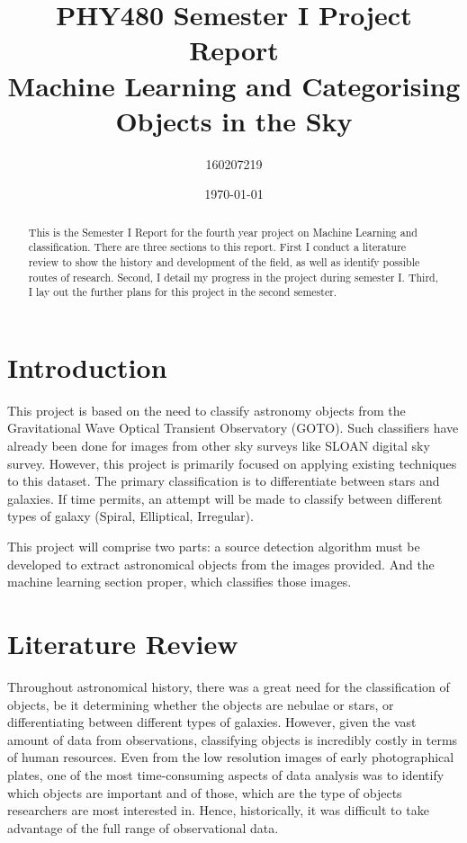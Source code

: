 \documentclass[a4paper,11pt]{article}
\title{{\small PHY480 Semester I Project Report}
\\
\vspace{5mm}
Machine Learning and Categorising Objects in the Sky}
\author{160207219}
\date{\today}
\begin{document}
\maketitle

\begin{abstract}
This is the Semester I Report for the fourth year project on Machine Learning and classification. There are three sections to this report. First I conduct a literature review to show the history and development of the field, as well as identify possible routes of research. Second, I detail my progress in the project during semester I. Third, I lay out the further plans for this project in the second semester.\\

\end{abstract}

\section{Introduction}
This project is based on the need to classify astronomy objects from the Gravitational Wave Optical Transient Observatory (GOTO). Such classifiers have already been done for images from other sky surveys like SLOAN digital sky survey. However, this project is primarily focused on applying existing techniques to this dataset. The primary classification is to differentiate between stars and galaxies. If time permits, an attempt will be made to classify between different types of galaxy (Spiral, Elliptical, Irregular).

This project will comprise two parts: a source detection algorithm must be developed to extract astronomical objects from the images provided. And the machine learning section proper, which classifies those images. 



\section{Literature Review}
Throughout astronomical history, there was a great need for the classification of objects, be it determining whether the objects are nebulae or stars, or differentiating between different types of galaxies. However, given the vast amount of data from observations, classifying objects is incredibly costly in terms of human resources. Even from the low resolution images of early photographical plates, one of the most time-consuming aspects of data analysis was to identify which objects are important and of those, which are the type of objects researchers are most interested in. Hence, historically, it was difficult to take advantage of the full range of observational data.
\end{document}
